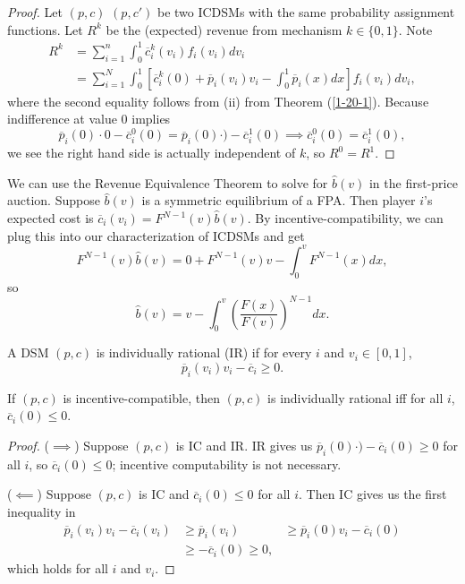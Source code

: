 \begin{proof}
	Let $(p,c)$ $(p,c')$ be two ICDSMs with the same probability assignment functions. Let $R^k$ be the (expected) revenue from mechanism $k \in \{0,1\}$. Note
	\begin{align*}
		R^k &= \sum\limits_{i=1}^{n} \int_{0}^{1} \overline{c}^{k}_i(v_i) f_i(v_i)dv_i   \\
		&= \sum\limits_{i=1}^{N} \int_{0}^{1} \left[ \overline{c}_i^{k}(0) + \overline{p}_i(v_i) v_i - \int_{0}^{1} \overline{p}_i(x)dx  \right] f_i(v_i)dv_i
	,\end{align*} where the second equality follows from (ii) from Theorem (\ref{1-20-1}).	Because indifference at value $0$ implies \[
		\overline{p}_i(0) \cdot 0 - \overline{c}_i^{0}(0) = \overline{p}_i(0) \cdot ) - \overline{c}_i^{1}(0) \implies \overline{c}_i^{0}(0) = \overline{c}_i^{1}(0)
	,\] we see the right hand side is actually independent of $k$, so $R^0 = R^1$. 
\end{proof}

\begin{remark}	We can use the Revenue Equivalence Theorem to solve for $\hat{b}(v)$ in the first-price auction. Suppose $\hat{b}(v)$ is a symmetric equilibrium of a FPA. Then player $i$'s expected cost is $\overline{c}_i(v_i) = F^{N-1}(v) \hat{b}(v)$. By incentive-compatibility, we can plug this into our characterization of ICDSMs and get \[
		F^{N-1}(v) \hat{b}(v) = 0 + F^{N-1}(v)v - \int_{0}^{v} F^{N-1}(x)dx 
	,\] so \[
		\hat{b}(v) = v- \int_{0}^{v} \left( \frac{F(x)}{F(v)} \right)^{N-1}dx
	.\] 
\end{remark}

\begin{definition}
	A DSM $(p,c)$ is individually rational (IR) if for every $i$ and $v_i \in [0,1]$, \[
		\overline{p}_i(v_i)v_i - \overline{c}_i \ge 0
	.\] 
\end{definition}

\begin{proposition}	If $(p,c)$ is incentive-compatible, then $(p,c)$ is individually rational iff for all $i$, $\overline{c}_i(0) \le 0$.
\end{proposition}

\begin{proof}
	($\implies$) Suppose $(p,c)$ is IC and IR. IR gives us $\overline{p}_i(0) \cdot ) - \overline{c}_i(0) \ge 0$ for all $i$, so $\overline{c}_i(0) \le 0$; incentive computability is not necessary.

	($\impliedby$) Suppose $(p,c)$ is IC and $\overline{c}_i(0) \le 0$ for all $i$. Then IC gives us the first inequality in
	\begin{align*}
		\overline{p}_i(v_i)v_i - \overline{c}_i(v_i) &\ge \overline{p}_i (v_i) &\ge \overline{p}_i(0) v_i - \overline{c}_i \left( 0 \right) \\
													 &\ge -\overline{c}_i(0) \ge 0
	,\end{align*}
	which holds for all $i$ and $v_i$.
\end{proof}
